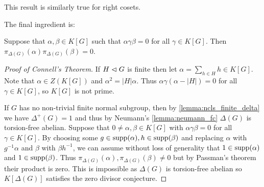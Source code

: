 This result is similarly true for right cosets.

The final ingredient is:
\begin{theorem}[Passman]
    Suppose that $\alpha, \beta \in K[G]$ such that $\alpha \gamma \beta = 0$ for all $\gamma \in K[G]$.
    Then $\pi_{\Delta(G)}(\alpha) \pi_{\Delta(G)}(\beta) = 0$.
\end{theorem}

\begin{proof}[Proof of Connell's Theorem]
    If $H \vartriangleleft G$ is finite then let $\alpha = \sum_{h \in H} h \in K[G]$.
    Note that $\alpha \in Z(K[G])$ and $\alpha^2 = |H| \alpha$.
    Thus $\alpha \gamma (\alpha - |H|) = 0$ for all $\gamma \in K[G]$, so $K[G]$ is not prime.

    If $G$ has no non-trivial finite normal subgroup, then by \cref{lemma:ncls_finite_delta} we have $\Delta^+(G) = 1$ and thus by Neumann's \cref{lemma:neumann_fc} $\Delta(G)$ is torsion-free abelian.
    Suppose that $0 \neq \alpha, \beta \in K[G]$ with $\alpha \gamma \beta = 0$ for all $\gamma \in K[G]$.
    By choosing some $g \in \operatorname{supp}(\alpha), h \in \operatorname{supp}(\beta)$ and replacing $\alpha$ with $g^{-1} \alpha$ and $\beta$ with $\beta h^{-1}$, we can assume without loss of generality that $1 \in \operatorname{supp}(\alpha)$ and $1 \in \operatorname{supp}(\beta)$.
    Thus $\pi_{\Delta(G)}(\alpha), \pi_{\Delta(G)}(\beta) \neq 0$ but by Passman's theorem their product is zero.
    This is impossible as $\Delta(G)$ is torsion-free abelian so $K[\Delta(G)]$ satisfies the zero divisor conjecture.
\end{proof}

